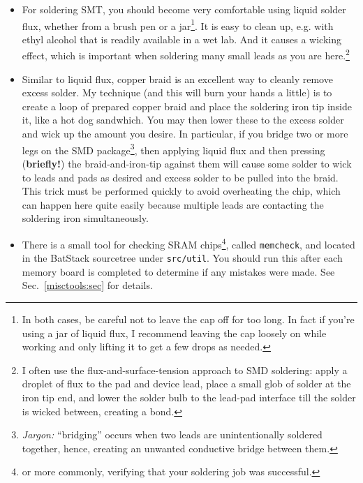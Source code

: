 \documentclass[letterpaper]{article}
\begin{document}
\begin{itemize}
\item For soldering SMT, you should become very comfortable using
  liquid solder flux, whether from a brush pen or a jar\footnote{In
    both cases, be careful not to leave the cap off for too long. In
    fact if you're using a jar of liquid flux, I recommend leaving the
    cap loosely on while working and only lifting it to get a few
    drops as needed.}. It is easy to clean up, e.g. with ethyl alcohol
  that is readily available in a wet lab. And it causes a wicking
  effect, which is important when soldering many small leads as you
  are here.\footnote{I often use the flux-and-surface-tension approach
    to SMD soldering: apply a droplet of flux to the pad and device
    lead, place a small glob of solder at the iron tip end, and lower
    the solder bulb to the lead-pad interface till the solder is
    wicked between, creating a bond.}

\item Similar to liquid flux, copper braid is an excellent way to
  cleanly remove excess solder. My technique (and this will burn your
  hands a little) is to create a loop of prepared copper braid and
  place the soldering iron tip inside it, like a hot dog
  sandwhich. You may then lower these to the excess solder and wick up
  the amount you desire. In particular, if you bridge two or more legs
  on the SMD package\footnote{\textit{Jargon:} ``bridging'' occurs
    when two leads are unintentionally soldered together, hence,
    creating an unwanted conductive bridge between them.}, then
  applying liquid flux and then pressing (\textbf{briefly!}) the
  braid-and-iron-tip against them will cause some solder to wick to
  leads and pads as desired and excess solder to be pulled into the
  braid. This trick must be performed quickly to avoid overheating the
  chip, which can happen here quite easily because multiple leads are
  contacting the soldering iron simultaneously.

\item There is a small tool for checking SRAM chips\footnote{or more
  commonly, verifying that your soldering job was successful.}, called
  \texttt{memcheck}, and located in the BatStack sourcetree under
  \texttt{src/util}. You should run this after each memory board is
  completed to determine if any mistakes were made. See
  Sec.~\ref{misctools:sec} for details.
\end{itemize}
\end{document}
